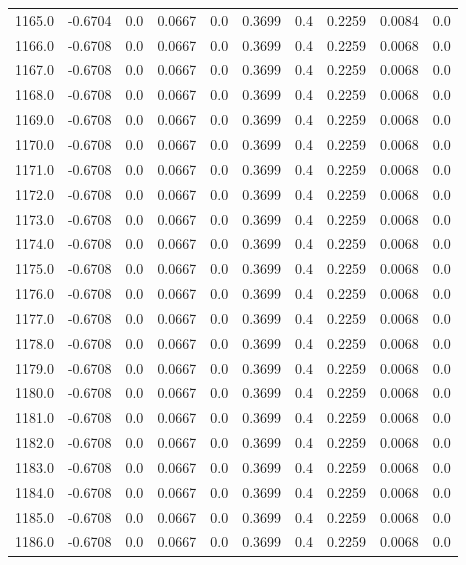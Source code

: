 \begin{longtable}{lrrrrrrrrr}
1165.0 & -0.6704 & 0.0 & 0.0667 & 0.0 & 0.3699 & 0.4 & 0.2259 & 0.0084 & 0.0 \\
1166.0 & -0.6708 & 0.0 & 0.0667 & 0.0 & 0.3699 & 0.4 & 0.2259 & 0.0068 & 0.0 \\
1167.0 & -0.6708 & 0.0 & 0.0667 & 0.0 & 0.3699 & 0.4 & 0.2259 & 0.0068 & 0.0 \\
1168.0 & -0.6708 & 0.0 & 0.0667 & 0.0 & 0.3699 & 0.4 & 0.2259 & 0.0068 & 0.0 \\
1169.0 & -0.6708 & 0.0 & 0.0667 & 0.0 & 0.3699 & 0.4 & 0.2259 & 0.0068 & 0.0 \\
1170.0 & -0.6708 & 0.0 & 0.0667 & 0.0 & 0.3699 & 0.4 & 0.2259 & 0.0068 & 0.0 \\
1171.0 & -0.6708 & 0.0 & 0.0667 & 0.0 & 0.3699 & 0.4 & 0.2259 & 0.0068 & 0.0 \\
1172.0 & -0.6708 & 0.0 & 0.0667 & 0.0 & 0.3699 & 0.4 & 0.2259 & 0.0068 & 0.0 \\
1173.0 & -0.6708 & 0.0 & 0.0667 & 0.0 & 0.3699 & 0.4 & 0.2259 & 0.0068 & 0.0 \\
1174.0 & -0.6708 & 0.0 & 0.0667 & 0.0 & 0.3699 & 0.4 & 0.2259 & 0.0068 & 0.0 \\
1175.0 & -0.6708 & 0.0 & 0.0667 & 0.0 & 0.3699 & 0.4 & 0.2259 & 0.0068 & 0.0 \\
1176.0 & -0.6708 & 0.0 & 0.0667 & 0.0 & 0.3699 & 0.4 & 0.2259 & 0.0068 & 0.0 \\
1177.0 & -0.6708 & 0.0 & 0.0667 & 0.0 & 0.3699 & 0.4 & 0.2259 & 0.0068 & 0.0 \\
1178.0 & -0.6708 & 0.0 & 0.0667 & 0.0 & 0.3699 & 0.4 & 0.2259 & 0.0068 & 0.0 \\
1179.0 & -0.6708 & 0.0 & 0.0667 & 0.0 & 0.3699 & 0.4 & 0.2259 & 0.0068 & 0.0 \\
1180.0 & -0.6708 & 0.0 & 0.0667 & 0.0 & 0.3699 & 0.4 & 0.2259 & 0.0068 & 0.0 \\
1181.0 & -0.6708 & 0.0 & 0.0667 & 0.0 & 0.3699 & 0.4 & 0.2259 & 0.0068 & 0.0 \\
1182.0 & -0.6708 & 0.0 & 0.0667 & 0.0 & 0.3699 & 0.4 & 0.2259 & 0.0068 & 0.0 \\
1183.0 & -0.6708 & 0.0 & 0.0667 & 0.0 & 0.3699 & 0.4 & 0.2259 & 0.0068 & 0.0 \\
1184.0 & -0.6708 & 0.0 & 0.0667 & 0.0 & 0.3699 & 0.4 & 0.2259 & 0.0068 & 0.0 \\
1185.0 & -0.6708 & 0.0 & 0.0667 & 0.0 & 0.3699 & 0.4 & 0.2259 & 0.0068 & 0.0 \\
1186.0 & -0.6708 & 0.0 & 0.0667 & 0.0 & 0.3699 & 0.4 & 0.2259 & 0.0068 & 0.0 \\

\end{longtable}
